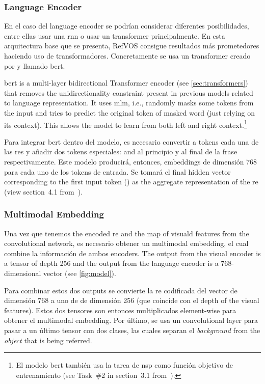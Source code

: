 \subsubsection{Language Encoder}
En el caso del language encoder se podrían considerar diferentes posibilidades,
entre ellas usar una \gls{rnn} o usar un transformer principalmente. En esta
arquitectura base que se presenta, RefVOS consigue resultados más prometedores
haciendo uso de transformadores. Concretamente se usa un transformer creado por
 y llamado \gls{bert}.

\gls{bert} is a multi-layer bidirectional Transformer encoder (see
\vref{sec:transformers}) that removes the unidirectionality constraint present
in previous models related to language representation. It uses \gls{mlm}, i.e.,
randomly masks some tokens from the input and tries to predict the original
token of masked word (just relying on its context). This allows the model to
learn from both left and right context.\footnote{El modelo \gls{bert} también
  usa la tarea de \gls{nsp} como función objetivo de entrenamiento (see
  Task~\#2 in section~3.1 from~\cite{devlin19:bert}).}

Para integrar \gls{bert} dentro del modelo, es necesario convertir a tokens
cada una de las \glspl{re} y añadir dos tokens especiales: \code{[CLS]} and
\code{[SEP]} al principio y al final de la frase respectivamente. Este modelo
producirá, entonces, embeddings de dimensión 768 para cada uno de los tokens de
entrada. Se tomará el final hidden vector corresponding to the first input
token (\code{[CLS]}) as the aggregate representation of the \gls{re} (view
section~4.1 from~\cite{devlin19:bert}).

\subsubsection{Multimodal Embedding}
Una vez que tenemos the encoded \gls{re} and the map of visuald features from
the convolutional network, es necesario obtener un multimodal embedding, el
cual combine la información de ambos encoders. The output from the visual
encoder is a tensor of depth 256 and the output from the language encoder is a
768-dimensional vector (see \vref{fig:model}).

Para combinar estos dos outputs se convierte la \gls{re} codificada del vector
de dimensión 768 a uno de de dimensión 256 (que coincide con el depth of the
visual features). Estos dos tensores son entonces multiplicados element-wise
para obtener el multimodal embedding. Por último, se usa un convolutional layer
para pasar a un último tensor con dos clases, las cuales separan el
\emph{background} from the \emph{object} that is being referred.


